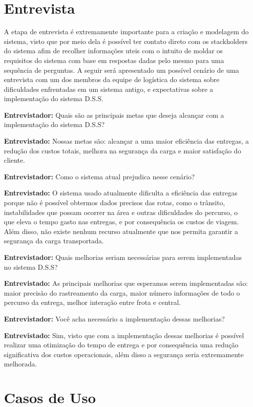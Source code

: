 \section{Entrevista}
A etapa de entrevista é extremamente importante para a criação e modelagem do sistema, visto que por meio dela é possível ter contato direto com os stackholders do sistema afim de recolher informações uteis com o intuito de moldar os requisitos do sistema com base em respostas dadas pelo mesmo para uma sequência de perguntas. A seguir será apresentado um possível cenário de uma entrevista com um dos membros da equipe de logística do sistema sobre dificuldades enfrentadas em um sistema antigo, e expectativas sobre a implementação do sistema D.S.S.

\textbf{Entrevistador:} Quais são as principais metas que deseja alcançar com a implementação do sistema D.S.S?

\textbf{Entrevistado:} Nossas metas são: alcançar a uma maior eficiência das entregas, a redução dos custos totais, melhora na segurança da carga e maior satisfação do cliente.

\textbf{Entrevistador:} Como o sistema atual prejudica nesse cenário?

\textbf{Entrevistado:} O sistema usado atualmente dificulta a eficiência das entregas porque não é possível obtermos dados precisos das rotas, como o trânsito, instabilidades que possam ocorrer na área e outras dificuldades do percurso, o que eleva o tempo gasto nas entregas, e por consequência os custos de viagem. Além disso, não existe nenhum recurso atualmente que nos permita garantir a segurança da carga transportada.

\textbf{Entrevistador:} Quais melhorias seriam necessárias para serem implementadas no sistema D.S.S?

\textbf{Entrevistado:} As principais melhorias que esperamos serem implementadas são: maior precisão do rastreamento da carga, maior número informações de todo o percurso da entrega, melhor interação entre frota e central.

\textbf{Entrevistador:} Você acha necessário a implementação dessas melhorias?

\textbf{Entrevistado:} Sim, visto que com a implementação dessas melhorias é possível realizar uma otimização do tempo de entrega e por consequência uma redução significativa dos custos operacionais, além disso a segurança seria extremamente melhorada.

\section{ Casos de Uso}

